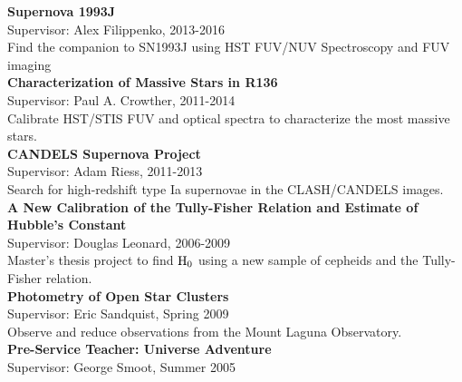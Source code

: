 \documentclass[10pt]{cv}
\begin{document}
\begin{llist}
{\bf  Supernova 1993J}\hspace{180pt} \\
\hspace*{24pt}Supervisor: Alex Filippenko, 2013-2016 \\
\hspace*{24pt}Find the companion to SN1993J using HST FUV/NUV Spectroscopy and FUV imaging \\
{\bf  Characterization of Massive Stars in R136 } \hspace{45pt} \\
\hspace*{24pt}Supervisor: Paul A. Crowther, 2011-2014\\
\hspace*{24pt}Calibrate HST/STIS FUV and optical spectra to characterize the most massive stars. \\
{\bf CANDELS Supernova Project}\hspace{116pt}\\
\hspace*{24pt}Supervisor: Adam Riess, 2011-2013 \\
\hspace*{24pt}Search for high-redshift type Ia supernovae in the CLASH/CANDELS images.\\
{\bf  A New Calibration of the Tully-Fisher Relation and Estimate of Hubble's Constant} \\ %
\hspace*{24pt}Supervisor: Douglas Leonard, 2006-2009\\
\hspace*{24pt}Master's thesis project to find $\rm{H_0}$ using a new sample of cepheids and the Tully-Fisher relation.   \\
{\bf Photometry of Open Star Clusters } \hspace{87pt}\\
\hspace*{24pt}Supervisor: Eric Sandquist, Spring 2009\\
\hspace*{24pt}Observe and reduce observations from the Mount Laguna Observatory. \\ 
{\bf Pre-Service Teacher: Universe Adventure} \hspace{56pt}\\
\hspace*{24pt}Supervisor: George Smoot, Summer 2005 \\

\end{llist}
\end{document}

